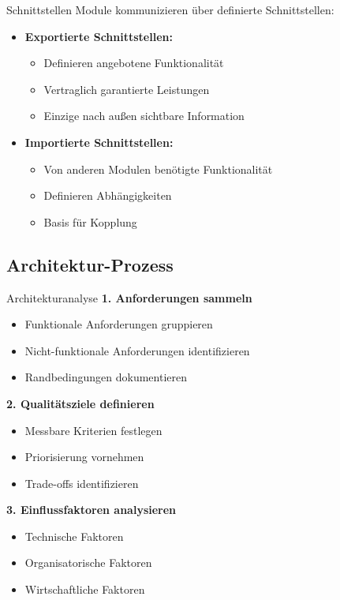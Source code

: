\begin{definition}{Schnittstellen}
Module kommunizieren über definierte Schnittstellen:
\begin{itemize}
    \item \textbf{Exportierte Schnittstellen:}
    \begin{itemize}
        \item Definieren angebotene Funktionalität
        \item Vertraglich garantierte Leistungen
        \item Einzige nach außen sichtbare Information
    \end{itemize}
    
    \item \textbf{Importierte Schnittstellen:}
    \begin{itemize}
        \item Von anderen Modulen benötigte Funktionalität
        \item Definieren Abhängigkeiten
        \item Basis für Kopplung
    \end{itemize}
\end{itemize}
\end{definition}

\subsection{Architektur-Prozess}

\begin{KR}{Architekturanalyse}
\textbf{1. Anforderungen sammeln}
\begin{itemize}
    \item Funktionale Anforderungen gruppieren
    \item Nicht-funktionale Anforderungen identifizieren
    \item Randbedingungen dokumentieren
\end{itemize}

\textbf{2. Qualitätsziele definieren}
\begin{itemize}
    \item Messbare Kriterien festlegen
    \item Priorisierung vornehmen
    \item Trade-offs identifizieren
\end{itemize}

\textbf{3. Einflussfaktoren analysieren}
\begin{itemize}
    \item Technische Faktoren
    \item Organisatorische Faktoren
    \item Wirtschaftliche Faktoren
\end{itemize}
\end{KR}

